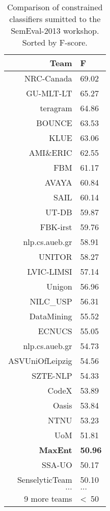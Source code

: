 \documentclass[final,3p,12pt]{elsarticle}
\begin{document}
\begin{table}[H]
    \begin{center}
    \begin{tabular}{|r|l|}
        \hline
        Team       & F \\
        \hline
        NRC-Canada & 69.02 \\
        GU-MLT-LT  & 65.27 \\
        teragram   & 64.86 \\
        BOUNCE     & 63.53 \\
        KLUE       & 63.06 \\
        AMI\&ERIC  & 62.55 \\
        FBM        & 61.17 \\
        AVAYA      & 60.84 \\
        SAIL       & 60.14 \\
        UT-DB      & 59.87 \\
        FBK-irst   & 59.76 \\
        nlp.cs.aueb.gr & 58.91 \\
        UNITOR     & 58.27 \\
        LVIC-LIMSI & 57.14 \\
        Unigon     & 56.96 \\
        NILC\_USP  & 56.31 \\
        DataMining & 55.52 \\
        ECNUCS     & 55.05 \\
        nlp.cs.aueb.gr & 54.73 \\
        ASVUniOfLeipzig & 54.56 \\
        SZTE-NLP   & 54.33 \\
        CodeX      & 53.89 \\
        Oasis      & 53.84 \\
        NTNU       & 53.23 \\
        UoM        & 51.81 \\
        \textbf{MaxEnt}& \textbf{50.96} \\
        SSA-UO     & 50.17 \\
        SenselyticTeam & 50.10 \\
        $\ldots$   & $\ldots$ \\
        9 more teams &  \textless\ 50 \\
        \hline
    \end{tabular}
    \end{center}
    \caption{Comparison of constrained classifiers sumitted to the SemEval-2013
        workshop. Sorted by F-score.}
    \label{table:comparison}
\end{table}
\end{document}
